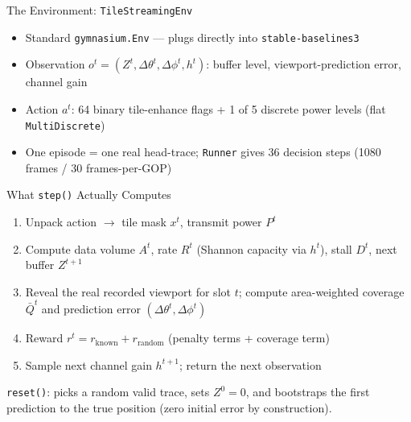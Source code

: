 \documentclass[aspectratio=169]{beamer}
\begin{document}
\begin{frame}{The Environment: \texttt{TileStreamingEnv}}
  \begin{center}
  \end{center}

  \begin{itemize}
    \item Standard \texttt{gymnasium.Env} --- plugs directly into \texttt{stable-baselines3}
    \item Observation $o^t = (Z^t, \Delta\theta^t, \Delta\phi^t, h^t)$: buffer level, viewport-prediction error, channel gain
    \item Action $a^t$: 64 binary tile-enhance flags + 1 of 5 discrete power levels (flat \texttt{MultiDiscrete})
    \item One episode = one real head-trace; \texttt{Runner} gives 36 decision steps (1080 frames / 30 frames-per-GOP)
  \end{itemize}
\end{frame}

\begin{frame}{What \texttt{step()} Actually Computes}
  \begin{enumerate}
    \item Unpack action $\to$ tile mask $x^t$, transmit power $P^t$
    \item Compute data volume $A^t$, rate $R^t$ (Shannon capacity via $h^t$), stall $D^t$, next buffer $Z^{t+1}$
    \item Reveal the real recorded viewport for slot $t$; compute area-weighted coverage $\bar Q^t$ and prediction error $(\Delta\theta^t,\Delta\phi^t)$
    \item Reward $r^t = r_{\text{known}} + r_{\text{random}}$ (penalty terms + coverage term)
    \item Sample next channel gain $h^{t+1}$; return the next observation
  \end{enumerate}

  \vspace{6pt}
  \texttt{reset()}: picks a random valid trace, sets $Z^0{=}0$, and bootstraps the first prediction to the true position (zero initial error by construction).
\end{frame}
\end{document}
